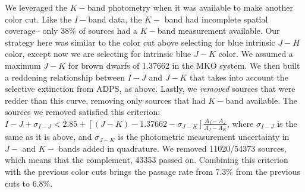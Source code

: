 We leveraged the $K-$band photometry when it was available to make another color cut.  Like the $I-$band data, the $K-$ band had incomplete spatial coverage-- only 38\% of sources had a $K-$band measurement available.  Our strategy here was similar to the color cut above selecting for blue intrinsic $J-H$ color, except now we are selecting for intrinsic blue $J-K$ color.  We assumed a maximum $J-K$ for brown dwarfs of 1.37662 in the MKO system.  We then built a reddening relationship between $I-J$ and $J-K$ that takes into account the selective extinction from ADPS, as above.  Lastly, we \emph{removed} sources that were redder than this curve, removing only sources that had $K-$band available.  The sources we removed satisfied this criterion:  $I-J + \sigma_{I-J} < 2.85 + [(J-K) - 1.37662 - \sigma_{J-K}]\frac{A_I-A_J}{A_J - A_K}$, where $\sigma_{I-J}$ is the same as it is above, and $\sigma_{J-K}$ is the photometric measurement uncertainty in $J-$ and $K-$ bands added in quadrature.  We removed 11020/54373 sources, which means that the complement, 43353 passed on.  Combining this criterion with the previous color cuts brings the passage rate from 7.3\% from the previous cuts to 6.8\%.

